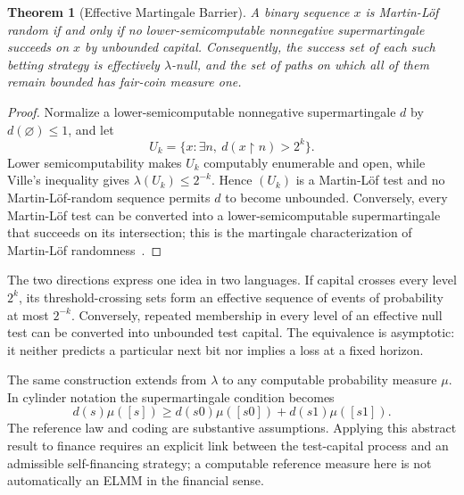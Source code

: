 \documentclass[aps,pra,reprint,superscriptaddress,amsmath,amssymb,floatfix]{revtex4-2}
\theoremstyle{plain}
\newtheorem{theorem}{Theorem}
\theoremstyle{definition}
\theoremstyle{remark}
\begin{document}
\begin{theorem}[Effective Martingale Barrier]
  \label{thm:effective}
  A binary sequence \(x\) is Martin-L\"of random if and only if no
  lower-semicomputable nonnegative supermartingale succeeds on \(x\) by
  unbounded capital. Consequently, the success set of each such betting
  strategy is effectively \(\lambda\)-null, and the set of paths on which all
  of them remain bounded has fair-coin measure one.
\end{theorem}

\begin{proof}
Normalize a lower-semicomputable nonnegative supermartingale \(d\) by
\(d(\varnothing)\leq1\), and let
\[
  U_k=\{x:\exists n,\ d(x{\upharpoonright}n)>2^k\}.
\]
Lower semicomputability makes \(U_k\) computably enumerable and open, while
Ville's inequality gives \(\lambda(U_k)\leq2^{-k}\). Hence
\((U_k)\) is a Martin-L\"of test and no Martin-L\"of-random sequence permits
\(d\) to become unbounded. Conversely, every Martin-L\"of test can be converted
into a lower-semicomputable supermartingale that succeeds on its intersection;
this is the martingale characterization of Martin-L\"of
randomness~\cite{calude:02,Nies2009}.
\end{proof}

The two directions express one idea in two languages. If capital crosses every
level \(2^k\), its threshold-crossing sets form an effective sequence of events
of probability at most \(2^{-k}\). Conversely, repeated membership in every
level of an effective null test can be converted into unbounded test capital.
The equivalence is asymptotic: it neither predicts a particular next bit nor
implies a loss at a fixed horizon.

The same construction extends from \(\lambda\) to any computable probability
measure \(\mu\). In cylinder notation the supermartingale condition becomes
\[
 d(s)\mu([s])\geq
 d(s0)\mu([s0])+d(s1)\mu([s1]).
\]
The reference law and coding are substantive assumptions. Applying this
abstract result to finance requires an explicit link between the test-capital
process and an admissible self-financing strategy; a computable reference
measure here is not automatically an ELMM in the financial sense.
\end{document}
